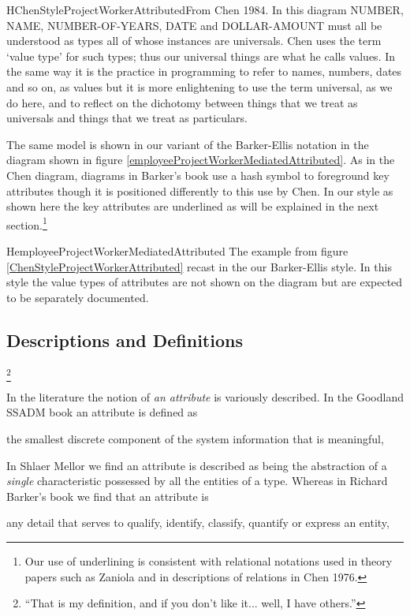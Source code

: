 \begin{erboxedFigure} {H}{ChenStyleProjectWorkerAttributed}{From Chen 1984. In this diagram NUMBER, NAME, NUMBER-OF-YEARS, DATE and DOLLAR-AMOUNT must all be understood as types all of whose instances are universals. Chen uses the term `value type' for such types;
thus our universal things are what he calls values. In the same way it is 
the practice in programming to refer to names, numbers, dates and so on, as values but it is more enlightening to use  the term universal, as we do here, and to reflect on  the dichotomy between things that we treat as universals and things that we treat as particulars. }

\end{erboxedFigure}

The same model is shown in our variant of the Barker-Ellis notation
 in the diagram shown in figure \ref{employeeProjectWorkerMediatedAttributed}.
As in the Chen diagram, diagrams in Barker's book use a hash symbol to foreground key attributes though it  is positioned differently to this use by Chen. In our style as shown here the key attributes are underlined as will be explained in the next section.\footnote{Our use of underlining is consistent with relational notations used in theory papers such as Zaniola and in descriptions of relations in Chen 1976.}
\begin{erboxedFigure} {H}{employeeProjectWorkerMediatedAttributed}
{The example from figure \ref{ChenStyleProjectWorkerAttributed} recast in the our Barker-Ellis style. 
In this style the value types of attributes are not shown on the diagram but are expected to be 
separately documented. }

\end{erboxedFigure}


\subsection{Descriptions and Definitions}\footnote{“That is my definition, and if you don’t like it... well, I have others.”}

\mynote
In the literature the notion of \textit{an attribute} is variously described.
In the Goodland SSADM book an attribute is defined as
\begin{erquote}
  the smallest discrete component of the system information that is meaningful,
\end{erquote}
In  Shlaer Mellor we find an attribute is described as being
the abstraction of a \textit{single} characteristic possessed by all the entities
of a type. Whereas in Richard Barker's book we find that an attribute is 
\begin{erquote}
any detail that serves to qualify, identify, classify, quantify or express an  entity,
\end{erquote}

